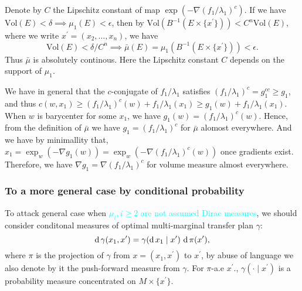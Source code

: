 
Denote by $C$ the Lipschitz constant of map \(\exp(-\nabla(f_1/\lambda_1)^c)\).
If we have $ \text{Vol}(E) < \delta \implies \mu_1(E) < \epsilon$,
then by $\text{Vol}(B^{-1}( E\times \{x^\prime\})) < C^n \text{Vol}(E)$,
where we write $x^\prime = (x_2, \ldots, x_n)$,
we have
\begin{equation}
	\label{equa:absolutely_continuity_estimation}
	\text{Vol}(E) < \delta / C^n \implies \bar{\mu}(E)=\mu_1(B^{-1}(E \times \{x^\prime\})) < \epsilon.
\end{equation}
Thus $\bar{\mu}$ is absolutely continous.
Here the Lipschitz constant $C$ depends on the support of $\mu_1$.

We have in general that the $c$-conjugate of $f_1 / \lambda_1$ satisfies
$(f_1 / \lambda_1)^c = g_1^{cc} \geq g_1$,
and thus $c(w, x_1) \geq (f_1 / \lambda_1)^c(w) + f_1/\lambda_1 (x_1) \geq g_1(w) + f_1/\lambda_1 (x_1)$.
When $w$ is barycenter for some $x_1$,
we have $g_1(w) = (f_1 / \lambda_1)^c(w)$.
Hence, from the definition of $\bar{\mu}$ we have
$g_1 = (f_1 /\lambda_1)^c$ for $\bar{\mu}$ alomost everywhere.
And we have by minimallity that,
$x_1 = \exp_w(- \nabla g_1(w)) = \exp_w(- \nabla (f_1 / \lambda_1)^c(w))$ once gradients exist.
Therefore, we have $\nabla g_1 = \nabla (f_1 / \lambda_1)^c$ for volume measure almost everywhere.

\subsubsection{To a more general case by conditional probability}
To attack general case when \textcolor{cyan}{$\mu_i, i \geq 2$ are not assumed Dirac measures},
we should consider conditonal measures of optimal multi-marginal transfer plan $\gamma$:
\[
	\operatorname{d} \gamma(x_1, x^\prime)= \gamma(\operatorname{d} x_1 \mid x^\prime)\, \operatorname{d} \pi(x^\prime) ,
\]
where $\pi$ is the projection of $\gamma$ from $x = (x_1, x^\prime)$ to $x^\prime$,
by abuse of language we also denote by it the push-forward measure from $\gamma$.
For $\pi$-a.e $x^\prime$., $\gamma(\cdot \mid x^\prime)$ is a probability measure
concentrated on $M \times \{x^\prime\}$.

